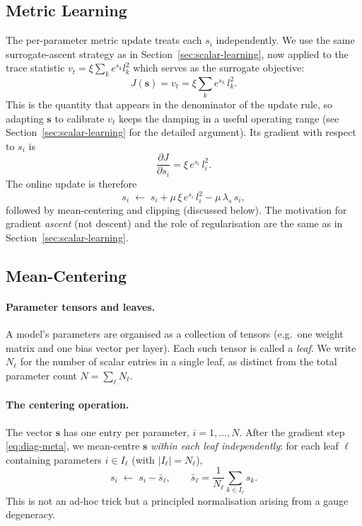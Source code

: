 \documentclass{article}
\newcommand{\vecb}[1]{\boldsymbol{#1}}
\begin{document}
\subsection{Metric Learning}
The per-parameter metric update treats each $s_i$ independently.
We use the same surrogate-ascent strategy as in Section~\ref{sec:scalar-learning},
now applied to the trace statistic $v_t = \xi\sum_k e^{s_k}l_k^2$
which serves as the surrogate objective:
$$
    J(\vecb{s}) = v_t = \xi\sum_k e^{s_k}\,l_k^2.
$$
This is the quantity that appears in the denominator of the update rule,
so adapting $\vecb{s}$ to calibrate $v_t$ keeps the damping in a useful operating range
(see Section~\ref{sec:scalar-learning} for the detailed argument).
Its gradient with respect to $s_i$ is $$
    \frac{\partial J}{\partial s_i} = \xi\,e^{s_i}\,l_i^2.
$$
The online update is therefore
\begin{equation}\label{eq:diag-meta}
    s_i \;\leftarrow\; s_i + \mu\,\xi\,e^{s_i}\,l_i^2 - \mu\,\lambda_s\,s_i,
\end{equation}
followed by mean-centering and clipping (discussed below).
The motivation for gradient \emph{ascent} (not descent) and the role of regularisation
are the same as in Section~\ref{sec:scalar-learning}.

\subsection{Mean-Centering}\label{sec:mean-center}

\paragraph{Parameter tensors and leaves.}
A model's parameters are organised as a collection of tensors
(e.g.\ one weight matrix and one bias vector per layer).
Each such tensor is called a \emph{leaf}.
We write $N_\ell$ for the number of scalar entries in a single leaf,
as distinct from the total parameter count $N = \sum_\ell N_\ell$.

\paragraph{The centering operation.}
The vector $\vecb{s}$ has one entry per parameter, $i=1,\ldots,N$.
After the gradient step \eqref{eq:diag-meta}, we mean-centre $\vecb{s}$
\emph{within each leaf independently}:
for each leaf $\ell$ containing parameters $i\in I_\ell$ (with $|I_\ell| = N_\ell$),
$$
    s_i \;\leftarrow\; s_i - \bar{s}_\ell, \qquad \bar{s}_\ell = \frac{1}{N_\ell}\sum_{k\in I_\ell} s_k.
$$
This is not an ad-hoc trick but a principled normalisation arising from a gauge degeneracy.
\end{document}
